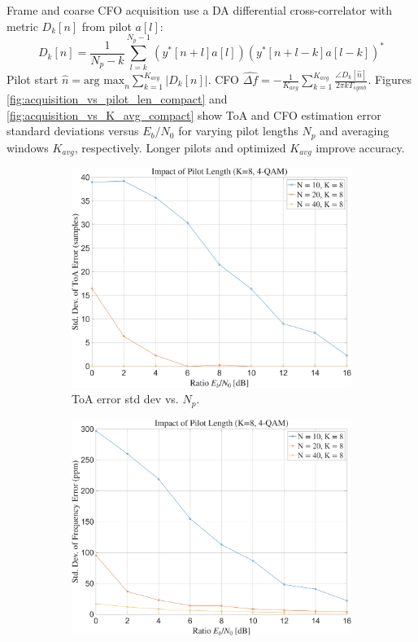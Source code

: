 \documentclass[11pt]{article}
\begin{document}
			Frame and coarse CFO acquisition use a DA differential cross-correlator with metric $D_k[n]$ from pilot $a[l]$:
			\begin{equation}
				D_k[n] = \frac{1}{N_p-k} \sum_{l=k}^{N_p-1} (y^*[n+l]a[l])(y^*[n+l-k]a[l-k])^*
			\end{equation}
			Pilot start $\hat{n} = \text{arg max}_n \sum_{k=1}^{K_{avg}} |D_k[n]|$. CFO $\hat{\Delta f} = -\frac{1}{K_{avg}} \sum_{k=1}^{K_{avg}} \frac{\angle D_k[\hat{n}]}{2\pi k T_{symb}}$. Figures \ref{fig:acquisition_vs_pilot_len_compact} and \ref{fig:acquisition_vs_K_avg_compact} show ToA and CFO estimation error standard deviations versus $E_b/N_0$ for varying pilot lengths $N_p$ and averaging windows $K_{avg}$, respectively. Longer pilots and optimized $K_{avg}$ improve accuracy.
			
			\begin{figure}[H]
				\centering
				\begin{subfigure}[b]{0.48\textwidth}
					\includegraphics[width=\linewidth]{Images/frame_sync_pilot_len.png} 
					\caption{ToA error std dev vs. $N_p$.}
				\end{subfigure}
				\hfill
				\begin{subfigure}[b]{0.48\textwidth}
					\includegraphics[width=\linewidth]{Images/cfo_est_pilot_len.png} 

\end{subfigure}
\end{figure}
\end{document}

